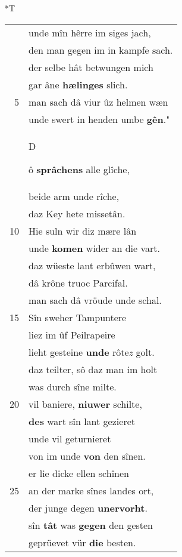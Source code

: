 \documentclass[8pt,a4paper,notitlepage]{article}
\begin{document}
\begin{table}[ht]
\begin{minipage}[t]{0.5\linewidth}
\end{minipage}
\hspace{0.5cm}
\begin{minipage}[t]{0.5\linewidth}
\small
\begin{center}*T
\end{center}
\begin{tabular}{rl}
 & unde mîn hêrre im siges jach,\\ 
 & den man gegen im in kampfe sach.\\ 
 & der selbe hât betwungen mich\\ 
 & gar âne \textbf{hælinges} slich.\\ 
5 & man sach dâ viur ûz helmen wæn\\ 
 & unde swert in henden umbe \textbf{gên}."\\ 
 & \begin{large}D\end{large}ô \textbf{sprâchens} alle glîche,\\ 
 & beide arm unde rîche,\\ 
 & daz Key hete missetân.\\ 
10 & Hie suln wir diz mære lân\\ 
 & unde \textbf{komen} wider an die vart.\\ 
 & daz wüeste lant erbûwen wart,\\ 
 & dâ krône truoc Parcifal.\\ 
 & man sach dâ vröude unde schal.\\ 
15 & Sîn sweher Tampuntere\\ 
 & liez im ûf Peilrapeire\\ 
 & lieht gesteine \textbf{unde} rôte\textit{z} golt.\\ 
 & daz teilter, sô daz man im holt\\ 
 & was durch sîne milte.\\ 
20 & vil baniere, \textbf{niuwer} schilte,\\ 
 & \textbf{des} wart sîn lant gezieret\\ 
 & unde vil geturnieret\\ 
 & von im unde \textbf{von} den sînen.\\ 
 & er lie dicke ellen schînen\\ 
25 & an der marke sînes landes ort,\\ 
 & der junge degen \textbf{unervorht}.\\ 
 & sîn \textbf{tât} was \textbf{gegen} den gesten\\ 
 & geprüevet vür \textbf{die} besten.\\ 

\end{tabular}
\end{minipage}
\end{table}
\end{document}

